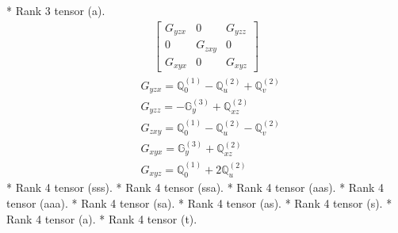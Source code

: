 \documentclass[fleqn,8pt,landscape]{jsarticle}
\begin{document}
* Rank 3 tensor (a).
\begin{align*}
\begin{bmatrix} G_{yzx} & 0 & G_{yzz} \\ 0 & G_{zxy} & 0 \\ G_{xyx} & 0 & G_{xyz} \end{bmatrix}
\end{align*}
\begin{align*}
& G_{yzx} = \mathbb{Q}_{0}^{(1)} - \mathbb{Q}_{u}^{(2)} + \mathbb{Q}_{v}^{(2)} \\
& G_{yzz} = - \mathbb{G}_{y}^{(3)} + \mathbb{Q}_{xz}^{(2)} \\
& G_{zxy} = \mathbb{Q}_{0}^{(1)} - \mathbb{Q}_{u}^{(2)} - \mathbb{Q}_{v}^{(2)} \\
& G_{xyx} = \mathbb{G}_{y}^{(3)} + \mathbb{Q}_{xz}^{(2)} \\
& G_{xyz} = \mathbb{Q}_{0}^{(1)} + 2 \mathbb{Q}_{u}^{(2)}
\end{align*}
* Rank 4 tensor (sss).
* Rank 4 tensor (ssa).
* Rank 4 tensor (aas).
* Rank 4 tensor (aaa).
* Rank 4 tensor (sa).
* Rank 4 tensor (as).
* Rank 4 tensor (s).
* Rank 4 tensor (a).
* Rank 4 tensor (t).
\end{document}
